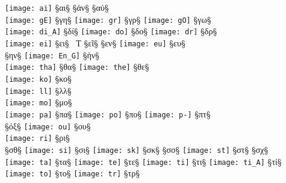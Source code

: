 \begin{liste}

 \texttt{[image: ai]} §{αι}§ \quad
{}  §{ἀν}§ \quad
{} §{αύ}§ \\

\texttt{[image: gE]} §{γη}§ \quad
\texttt{[image: gr]} §{γρ}§ \quad
\texttt{[image: gO]} §{γω}§ \\

\texttt{[image: di\_A]} §{δί}§ \quad
\texttt{[image: do]} §{δο}§ \quad
\texttt{[image: dr]} §{δρ}§ \\

 \texttt{[image: ei]} §{ει}§ \quad
{} \, { \Large Ƭ} §{εῖ}§ \quad
{}  §{εν}§ \quad
{} \texttt{[image: eu]} §{ευ}§ \\

 §{ην}§ \quad
\texttt{[image: En\_G]} §{ὴν}§ \\

\texttt{[image: tha]} §{θα}§ \quad
\texttt{[image: the]} §{θε}§ \\

\texttt{[image: ko]} §{κο}§ \\

 \texttt{[image: ll]} §{λλ}§ \\

\texttt{[image: mo]} §{μο}§ \\

\texttt{[image: pa]} §{πα}§ \quad
\texttt{[image: po]} §{πο}§ \quad
\texttt{[image: p-]} §{πτ}§ \\

{}   §{όξ}§ \quad
{} \texttt{[image: ou]} §{ου}§ \\

 \texttt{[image: ri]} §{ρι}§ \\

  §{σθ}§ \quad
\texttt{[image: si]} §{σι}§ \quad
\texttt{[image: sk]} §{σκ}§ \quad
{}  §{σσ}§ \quad
{} \texttt{[image: st]} §{στ}§ \quad
{} §{σχ}§ \\

\texttt{[image: ta]} §{τα}§ \quad
\texttt{[image: te]} §{τε}§ \quad
\texttt{[image: ti]} §{τι}§ \quad
\texttt{[image: ti\_A]} §{τί}§ \quad
\texttt{[image: to]} §{το}§ \quad
\texttt{[image: tr]} §{τρ}§ \\


\end{liste}
